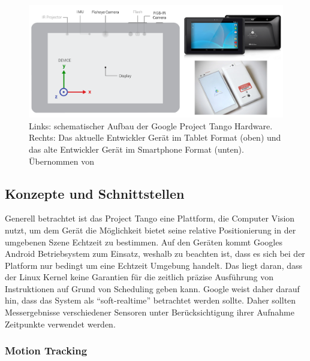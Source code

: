 \begin{figure}[h]
  \centering
	\includegraphics[width=1.0\textwidth]{content/images/theory/tango-device.png} 
  \caption{Links: schematischer Aufbau der Google Project Tango Hardware. Rechts: Das aktuelle Entwickler Gerät im Tablet Format (oben) und das alte Entwickler Gerät im Smartphone Format (unten). Übernommen von \citet{GoogleDevelopers:online}}
  \label{fig:tango-device}
\end{figure}

\subsection{Konzepte und Schnittstellen}

Generell betrachtet ist das Project Tango eine Plattform, die Computer Vision nutzt, um dem Gerät die Möglichkeit bietet seine relative Positionierung in der umgebenen Szene Echtzeit zu bestimmen. Auf den Geräten kommt Googles Android Betriebsystem zum Einsatz, weshalb zu beachten ist, dass es sich bei der Platform nur bedingt um eine Echtzeit Umgebung handelt. Das liegt daran, dass der Linux Kernel keine Garantien für die zeitlich präzise Ausführung von Instruktionen auf Grund von Scheduling geben kann. Google weist daher darauf hin, dass das System als \enquote{soft-realtime} betrachtet werden sollte. Daher sollten Messergebnisse verschiedener Sensoren unter Berücksichtigung ihrer Aufnahme Zeitpunkte verwendet werden. \citep{GoogleDevelopersConcepts:online} \\

\subsubsection{Motion Tracking}

